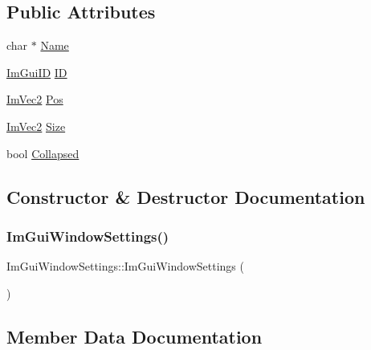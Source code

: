\subsection*{Public Attributes}
\begin{DoxyCompactItemize}
\item 
char $\ast$ \mbox{\hyperlink{struct_im_gui_window_settings_a840259e14a45a600f84fcb940554e2d5}{Name}}
\item 
\mbox{\hyperlink{imgui_8h_a1785c9b6f4e16406764a85f32582236f}{Im\+Gui\+ID}} \mbox{\hyperlink{struct_im_gui_window_settings_a5ae7316219230c82a05618c227e5a7b7}{ID}}
\item 
\mbox{\hyperlink{struct_im_vec2}{Im\+Vec2}} \mbox{\hyperlink{struct_im_gui_window_settings_a439e19e13a89681bc512f3282a253ebe}{Pos}}
\item 
\mbox{\hyperlink{struct_im_vec2}{Im\+Vec2}} \mbox{\hyperlink{struct_im_gui_window_settings_a9114134a6992827fbfc78bf4088e5f7f}{Size}}
\item 
bool \mbox{\hyperlink{struct_im_gui_window_settings_a79308182bdab97cb87b3d6284f22c1d2}{Collapsed}}
\end{DoxyCompactItemize}


\subsection{Constructor \& Destructor Documentation}
\mbox{\label{struct_im_gui_window_settings_a694e496dba59b5aaabe14cce66309acd}} 
\subsubsection{\texorpdfstring{Im\+Gui\+Window\+Settings()}{ImGuiWindowSettings()}}
{\footnotesize\ttfamily Im\+Gui\+Window\+Settings\+::\+Im\+Gui\+Window\+Settings (\begin{DoxyParamCaption}{ }\end{DoxyParamCaption})\hspace{0.3cm}{\ttfamily [inline]}}



\subsection{Member Data Documentation}
\mbox{\label{struct_im_gui_window_settings_a79308182bdab97cb87b3d6284f22c1d2}} 
